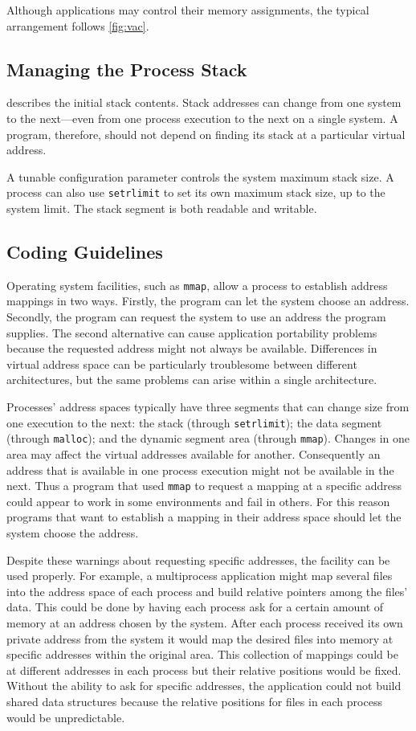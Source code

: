 \documentclass[USenglish,fontsize=11pt,twoside,%
  toc=bib,toc=idx,toc=graduated,numbers=noendperiod,
  bookmarks=true,
  bookmarksnumbered=true,
  bookmarksopen=true,
  bookmarksopenlevel=1,
  breaklinks=true,
  colorlinks=true,
  linkcolor=black,
  pdfpagelayout={TwoPageRight},
  pdfusetitle=true
]{scrreprt}
\begin{document}
Although applications may control their memory assignments, the
typical arrangement follows \cref{fig:vac}.

\subsection{Managing the Process Stack}
 describes the initial stack contents.
Stack addresses can change from one system to the next---even from one
process execution to the next on a single system.  A program,
therefore, should not depend on finding its stack at a particular
virtual address.

A tunable configuration parameter controls the system maximum stack size.
A process can also use \texttt{setrlimit} to set its own maximum stack
size, up to the system limit.  The stack segment is both readable and
writable.

\subsection{Coding Guidelines}
Operating system facilities, such as \texttt{mmap}, allow a process to
establish address mappings in two ways.  Firstly, the program can let
the system choose an address.  Secondly, the program can request the
system to use an address the program supplies.  The second alternative
can cause application portability problems because the requested
address might not always be available.  Differences in virtual address
space can be particularly troublesome between different architectures,
but the same problems can arise within a single architecture.

Processes' address spaces typically have three segments that can
change size from one execution to the next: the stack (through
\texttt{setrlimit}); the data segment (through \texttt{malloc}); and
the dynamic segment area (through \texttt{mmap}).  Changes in one area
may affect the virtual addresses available for another.  Consequently
an address that is available in one process execution might not be
available in the next.  Thus a program that used \texttt{mmap} to
request a mapping at a specific address could appear to work in some
environments and fail in others.  For this reason programs that want
to establish a mapping in their address space should let the system
choose the address.

Despite these warnings about requesting specific addresses, the
facility can be used properly.  For example, a multiprocess
application might map several files into the address space of each
process and build relative pointers among the files' data.  This could
be done by having each process ask for a certain amount of memory at
an address chosen by the system.  After each process received its own
private address from the system it would map the desired files into
memory at specific addresses within the original area.  This
collection of mappings could be at different addresses in each process
but their relative positions would be fixed.  Without the ability to
ask for specific addresses, the application could not build shared
data structures because the relative positions for files in each
process would be unpredictable.
\end{document}
